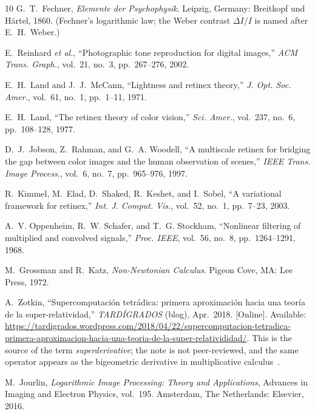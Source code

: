 \documentclass[conference]{IEEEtran}
\begin{document}
\begin{thebibliography}{10}
G.~T.~Fechner, \emph{Elemente der Psychophysik}. Leipzig, Germany:
Breitkopf und H\"artel, 1860.  (Fechner's logarithmic law; the Weber
contrast $\Delta I/I$ is named after E.~H.~Weber.)

E.~Reinhard \emph{et al.}, ``Photographic tone reproduction for digital images,''
\emph{ACM Trans. Graph.}, vol.~21, no.~3, pp.~267--276, 2002.

E.~H.~Land and J.~J.~McCann, ``Lightness and retinex theory,''
\emph{J. Opt. Soc. Amer.}, vol.~61, no.~1, pp.~1--11, 1971.

E.~H.~Land, ``The retinex theory of color vision,''
\emph{Sci. Amer.}, vol.~237, no.~6, pp.~108--128, 1977.

D.~J.~Jobson, Z.~Rahman, and G.~A. Woodell, ``A multiscale retinex for
bridging the gap between color images and the human observation of scenes,''
\emph{IEEE Trans. Image Process.}, vol.~6, no.~7, pp.~965--976, 1997.

R.~Kimmel, M.~Elad, D.~Shaked, R.~Keshet, and I.~Sobel, ``A variational
framework for retinex,'' \emph{Int. J. Comput. Vis.}, vol.~52, no.~1,
pp.~7--23, 2003.

A.~V. Oppenheim, R.~W. Schafer, and T.~G. Stockham, ``Nonlinear filtering of
multiplied and convolved signals,'' \emph{Proc. IEEE}, vol.~56, no.~8,
pp.~1264--1291, 1968.

M.~Grossman and R.~Katz, \emph{Non-Newtonian Calculus}. Pigeon Cove, MA:
Lee Press, 1972.

A.~Zotkin, ``Supercomputaci\'on tetr\'adica: primera aproximaci\'on hacia una
teor\'ia de la super-relatividad,'' \emph{TARD\'IGRADOS} (blog), Apr.~2018.
[Online]. Available:
\url{https://tardigrados.wordpress.com/2018/04/22/supercomputacion-tetradica-primera-aproximacion-hacia-una-teoria-de-la-super-relativididad/}.
This is the source of the term \emph{superderivative}; the note is not
peer-reviewed, and the same operator appears as the bigeometric derivative in
multiplicative calculus~\cite{grossman}.

M.~Jourlin, \emph{Logarithmic Image Processing: Theory and
Applications}, Advances in Imaging and Electron Physics, vol.~195. Amsterdam,
The Netherlands: Elsevier, 2016.


\end{thebibliography}
\end{document}
